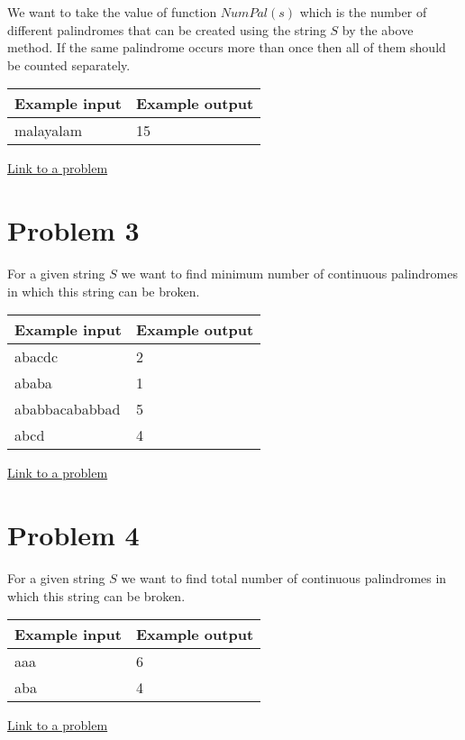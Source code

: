 \documentclass[12pt]{article}
\begin{document}
We want to take the value of function $NumPal(s)$ which is the number of different palindromes that can be created using the string $S$ by the above method. If the same palindrome occurs more than once then all of them should be counted separately.
\begin{table}[H]
\begin{tabular}{|l|l|}
\hline
Example input & Example output \\ \hline
malayalam     & 15             \\ \hline
\end{tabular}
\end{table}
\href{https://www.spoj.com/problems/NUMOFPAL/}{\underline{Link to a problem}}
\section*{Problem 3}
For a given string $S$ we want to find minimum number of continuous palindromes in which this string can be broken. 
\begin{table}[H]
\begin{tabular}{|l|l|}
\hline
Example input  & Example output \\ \hline
abacdc         & 2              \\ \hline
ababa          & 1              \\ \hline
ababbacababbad & 5              \\ \hline
abcd           & 4              \\ \hline
\end{tabular}
\end{table}
\href{https://www.spoj.com/problems/IITKWPCE/}{\underline{Link to a problem}}
\section*{Problem 4}
For a given string $S$ we want to find total number of continuous palindromes in which this string can be broken.
\begin{table}[H]
\begin{tabular}{|l|l|}
\hline
Example input & Example output \\ \hline
aaa           & 6              \\ \hline
aba           & 4              \\ \hline
\end{tabular}
\end{table}
\href{https://informatics.mccme.ru//mod/statements/view.php?chapterid=1750}{\underline{Link to a problem}}
\end{document}
